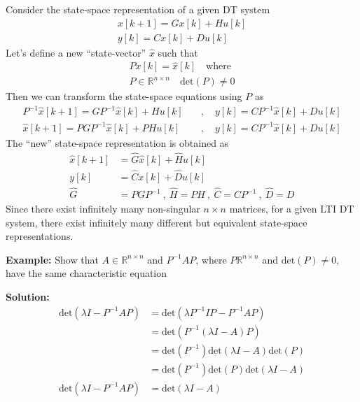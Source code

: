 \documentclass[twoside]{article}
\begin{document}
Consider the state-space representation of a 
given DT system
%
\begin{align*}
  x[k+1] = G x[k] + H u[k]
\\
  y[k] = C x[k] + D u[k]
\end{align*}
%
Let's define a new ``state-vector'' $\hat{x}$ such that
%
\begin{align*}
  P x[k] = \hat{x}[k] \quad \mathrm{where}
\\
  P \in \mathbb{R}^{n \times n} \quad \mathrm{det}(P) \neq 0
\end{align*}
%
Then we can transform the state-space equations using $P$
as
%
\begin{align*}
  P^{-1} \hat{x}[k+1] = G P^{-1} \hat{x}[k] + H u[k] 
\quad &, \quad y[k] = C P^{-1} \hat{x}[k] + D u[k]
\\
  \hat{x}[k+1] = P G P^{-1} \hat{x}[k] + P H u[k] 
\quad &, \quad y[k] = C P^{-1} \hat{x}[k] + D u[k]
\end{align*}
%
The ``new'' state-space representation is obtained as
%
\begin{align*}
  \hat{x}[k+1] &= \hat{G} \hat{x}[k] + \hat{H} u[k] 
    \\
  y[k] &= \hat{C} x[k] + \hat{D} u[k]
\\
\hat{G} &= P  G P^{-1} \ , \ \hat{H} = P  H \ , \ \hat{C} = C P^{-1} \ ,
  \ \hat{D} = D
\end{align*}
%
Since there exist infinitely many non-singular $n \times n$
matrices, for a given LTI DT system, there exist infinitely 
many different but equivalent state-space representations.

\vspace{24pt}

\textbf{Example:} Show that $A \in \mathbb{R}^{n \times n}$ and $P^{-1} A
P$, where $P \mathbb{R}^{n \times n}$ and $\mathrm{det}(P) \neq 0$, have the
same characteristic equation

\textbf{Solution:} 
\begin{align*}
  \mathrm{det}\left(\lambda I - P^{-1} A P \right) &= 
\mathrm{det}\left( \lambda P^{-1} I P - P^{-1} A P \right)
\\
&= \mathrm{det} \left( P^{-1} \left( \lambda I - A \right) P \right)
\\
&= \mathrm{det} \left( P^{-1} \right)
\mathrm{det} \left( \lambda I - A \right) 
\mathrm{det} \left( P \right)
\\
&= \mathrm{det} \left( P^{-1} \right) \mathrm{det} \left( P \right)
\mathrm{det} \left( \lambda I - A \right) 
\\
\mathrm{det}\left(\lambda I - P^{-1} A P \right) &= \mathrm{det} \left( \lambda I - A \right) 
\end{align*}
\end{document}
